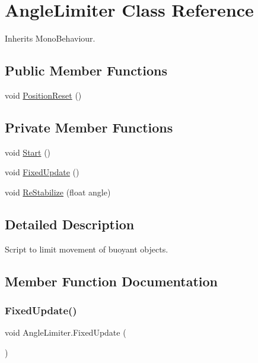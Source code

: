 \hypertarget{class_angle_limiter}{}\section{Angle\+Limiter Class Reference}
\label{class_angle_limiter}


Inherits Mono\+Behaviour.

\subsection*{Public Member Functions}
\begin{DoxyCompactItemize}
\item 
void \hyperlink{class_angle_limiter_a3a5ae25b493bc3057200370f827caf85}{Position\+Reset} ()
\end{DoxyCompactItemize}
\subsection*{Private Member Functions}
\begin{DoxyCompactItemize}
\item 
void \hyperlink{class_angle_limiter_a89e574bae24693203bab055a3a4fd184}{Start} ()
\item 
void \hyperlink{class_angle_limiter_afa4aa01bc9ab1fa09caede11d39cbaa4}{Fixed\+Update} ()
\item 
void \hyperlink{class_angle_limiter_afced607afbb55c3efcd949ee0e397b1a}{Re\+Stabilize} (float angle)
\end{DoxyCompactItemize}


\subsection{Detailed Description}
Script to limit movement of buoyant objects. 



\subsection{Member Function Documentation}
\mbox{\label{class_angle_limiter_afa4aa01bc9ab1fa09caede11d39cbaa4}} 
\subsubsection{\texorpdfstring{Fixed\+Update()}{FixedUpdate()}}
{\footnotesize\ttfamily void Angle\+Limiter.\+Fixed\+Update (\begin{DoxyParamCaption}{ }\end{DoxyParamCaption})\hspace{0.3cm}{\ttfamily [private]}}



